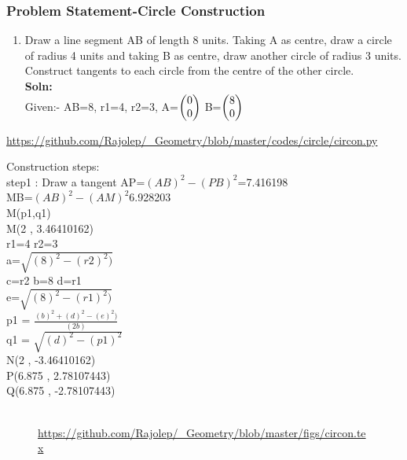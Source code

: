 \begin{frame}
\frametitle{Problem Statement-Circle Construction}
\begin{enumerate}[label=(\roman*)]
\item Draw a line segment AB of length 8 units. Taking A as centre, draw a circle of radius 4 units and taking B as centre, draw another circle of radius 3 units. Construct tangents to each circle from the centre of the other circle.\\
\textbf{Soln:}\\
Given:- AB=8, r1=4, r2=3, A=$\begin{pmatrix}0\\0\end{pmatrix}$ B=$\begin{pmatrix}8\\0\end{pmatrix}$\\
\end{enumerate}
\url{https://github.com/Rajolep/_Geometry/blob/master/codes/circle/circon.py}

\end{frame}
\begin{frame}

Construction steps:\\
step1 : Draw a tangent
AP=$(AB)^2-(PB)^2$=7.416198\\
MB=$(AB)^2-(AM)^2$6.928203\\
M(p1,q1)\\
M(2 , 3.46410162)\\
r1=4  r2=3\\
a=$\sqrt{(8)^2-(r2)^2)}$\\
c=r2 b=8  d=r1\\
e=$\sqrt{(8)^2-(r1)^2)}$\\
p1 = $\frac{(b)^2 + (d)^2-(e)^2 )}{(2b)}$\\
q1 = $\sqrt{(d)^2-(p1)^2}$\\
N(2 , -3.46410162)\\
P(6.875 , 2.78107443)\\
Q(6.875 , -2.78107443)\\
\end{frame}
\begin{frame}
\begin{figure}
\\
\url{https://github.com/Rajolep/_Geometry/blob/master/figs/circon.tex}

\end{figure}
\end{frame}